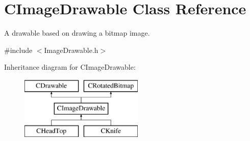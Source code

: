 \hypertarget{class_c_image_drawable}{\section{C\+Image\+Drawable Class Reference}
\label{class_c_image_drawable}
}


A drawable based on drawing a bitmap image.  




{\ttfamily \#include $<$Image\+Drawable.\+h$>$}

Inheritance diagram for C\+Image\+Drawable\+:\begin{figure}[H]
\begin{center}
\leavevmode
\includegraphics[height=3.000000cm]{class_c_image_drawable}
\end{center}
\end{figure}
